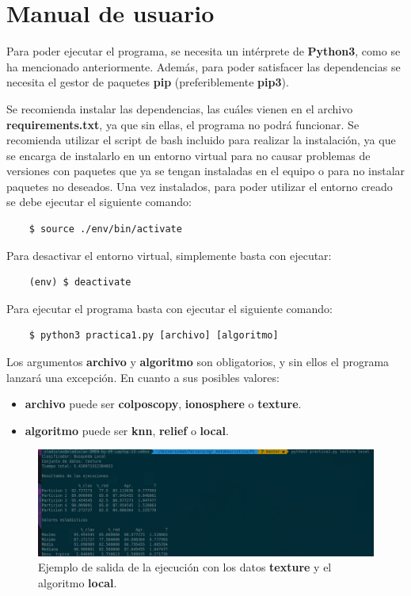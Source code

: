 \documentclass[11pt,a4paper]{article}
\begin{document}
\newpage

\section{Manual de usuario}

Para poder ejecutar el programa, se necesita un intérprete de \textbf{Python3}, como se ha mencionado anteriormente. Además,
para poder satisfacer las dependencias se necesita el gestor de paquetes \textbf{pip} (preferiblemente \textbf{pip3}).

Se recomienda instalar las dependencias, las cuáles vienen en el archivo \textbf{requirements.txt}, ya que sin ellas, el
programa no podrá funcionar. Se recomienda utilizar el script de bash incluido para realizar la instalación, ya que se
encarga de instalarlo en un entorno virtual para no causar problemas de versiones con paquetes que ya se tengan instaladas en
el equipo o para no instalar paquetes no deseados. Una vez instalados, para poder utilizar el entorno creado se debe ejecutar
el siguiente comando:

\begin{lstlisting}
	$ source ./env/bin/activate
\end{lstlisting}

Para desactivar el entorno virtual, simplemente basta con ejecutar:

\begin{lstlisting}
	(env) $ deactivate
\end{lstlisting}

Para ejecutar el programa basta con ejecutar el siguiente comando:

\begin{lstlisting}
	$ python3 practica1.py [archivo] [algoritmo]
\end{lstlisting}

Los argumentos \textbf{archivo} y \textbf{algoritmo} son obligatorios, y sin ellos el programa lanzará una excepción. En
cuanto a sus posibles valores:

\begin{itemize}[label=\textbullet]
	\item \textbf{archivo} puede ser \textbf{colposcopy}, \textbf{ionosphere} o \textbf{texture}.
	\item \textbf{algoritmo} puede ser \textbf{knn}, \textbf{relief} o \textbf{local}.
\end{itemize}

\begin{figure}[H]
\centering
\includegraphics[scale=0.35]{img/out_example.png}
\caption{Ejemplo de salida de la ejecución con los datos \textbf{texture} y el algoritmo \textbf{local}.}
\end{figure}
\end{document}
